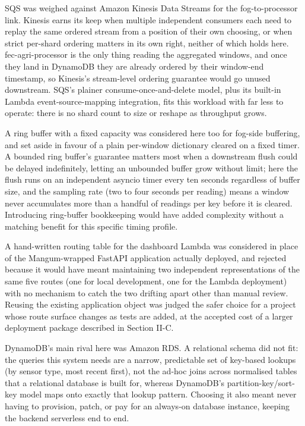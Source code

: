 \documentclass[conference]{IEEEtran}
\begin{document}
SQS was weighed against Amazon Kinesis Data Streams for the fog-to-processor link. Kinesis earns its keep when multiple independent consumers each need to replay the same ordered stream from a position of their own choosing, or when strict per-shard ordering matters in its own right, neither of which holds here. fec-agri-processor is the only thing reading the aggregated windows, and once they land in DynamoDB they are already ordered by their window-end timestamp, so Kinesis's stream-level ordering guarantee would go unused downstream. SQS's plainer consume-once-and-delete model, plus its built-in Lambda event-source-mapping integration, fits this workload with far less to operate: there is no shard count to size or reshape as throughput grows.

A ring buffer with a fixed capacity was considered here too for fog-side buffering, and set aside in favour of a plain per-window dictionary cleared on a fixed timer. A bounded ring buffer's guarantee matters most when a downstream flush could be delayed indefinitely, letting an unbounded buffer grow without limit; here the flush runs on an independent asyncio timer every ten seconds regardless of buffer size, and the sampling rate (two to four seconds per reading) means a window never accumulates more than a handful of readings per key before it is cleared. Introducing ring-buffer bookkeeping would have added complexity without a matching benefit for this specific timing profile.

A hand-written routing table for the dashboard Lambda was considered in place of the Mangum-wrapped FastAPI application actually deployed, and rejected because it would have meant maintaining two independent representations of the same five routes (one for local development, one for the Lambda deployment) with no mechanism to catch the two drifting apart other than manual review. Reusing the existing application object was judged the safer choice for a project whose route surface changes as tests are added, at the accepted cost of a larger deployment package described in Section II-C.

DynamoDB's main rival here was Amazon RDS. A relational schema did not fit: the queries this system needs are a narrow, predictable set of key-based lookups (by sensor type, most recent first), not the ad-hoc joins across normalised tables that a relational database is built for, whereas DynamoDB's partition-key/sort-key model maps onto exactly that lookup pattern. Choosing it also meant never having to provision, patch, or pay for an always-on database instance, keeping the backend serverless end to end.
\end{document}
